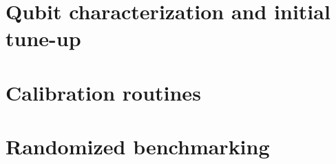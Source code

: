 \documentclass[12pt]{report}
\begin{document}
\section{Qubit characterization and initial tune-up}


\section{Calibration routines}


\section{Randomized benchmarking}
\end{document}
